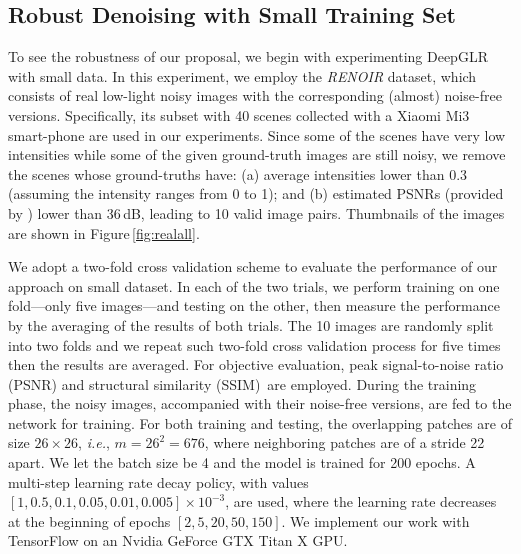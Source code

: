 \documentclass[10pt,twocolumn,letterpaper]{article}
\begin{document}
\subsection{Robust Denoising with Small Training Set}\label{ssec:samlldata}



To see the robustness of our proposal, we begin with experimenting DeepGLR with small data.
In this experiment, we employ the {\it RENOIR} \cite{anaya2018renoir} dataset, which consists of real low-light noisy images with the corresponding (almost) noise-free versions. 
Specifically, its subset with 40 scenes collected with a Xiaomi Mi3 smart-phone are used in our experiments.
Since some of the scenes have very low intensities while some of the given ground-truth images are still noisy, we remove the scenes whose ground-truths have: (a) average intensities lower than 0.3 (assuming the intensity ranges from 0 to 1); and (b) estimated PSNRs (provided by \cite{anaya2018renoir}) lower than 36\,dB, leading to 10 valid image pairs. 
Thumbnails of the images are shown in Figure\,\ref{fig:realall}. 

We adopt a two-fold cross validation scheme to evaluate the performance of our approach on small dataset. 
In each of the two trials, we perform training on one fold---only five images---and testing on the other, then measure the performance by the averaging of the results of both trials. 
The 10 images are randomly split into two folds and we repeat such two-fold cross validation process for five times then the results are averaged. 
For objective evaluation, peak signal-to-noise ratio (PSNR) and structural similarity (SSIM)\,\cite{wang2004image} are employed. 
During the training phase, the noisy images, accompanied with their noise-free versions, are fed to the network for training.
For both training and testing, the overlapping patches are of size $26 \times 26$, {\it i.e.}, $m = 26^2 = 676$, where neighboring patches are of a stride 22 apart. 
We let the batch size be 4 and the model is trained for 200 epochs. 
A multi-step learning rate decay policy, with values $[1, 0.5, 0.1, 0.05, 0.01, 0.005]\times 10^{-3}$, are used, where the learning rate decreases at the beginning of epochs $[2, 5, 20, 50, 150]$. 
We implement our work with TensorFlow \cite{tensorflow} on an Nvidia GeForce GTX Titan X GPU.
\end{document}
